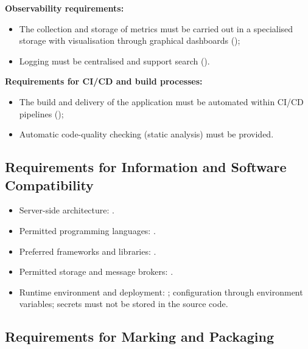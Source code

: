 \documentclass[12pt,a4paper]{extarticle}
\begin{document}
\textbf{Observability requirements:}

\begin{itemize}[leftmargin=1.25cm]
\item The collection and storage of metrics must be carried out in a specialised storage with visualisation through graphical dashboards ();
\item Logging must be centralised and support search ().
\end{itemize}

\textbf{Requirements for CI/CD and build processes:}

\begin{itemize}[leftmargin=1.25cm]
\item The build and delivery of the application must be automated within CI/CD pipelines ();
\item Automatic code-quality checking (static analysis) must be provided.
\end{itemize}

\subsection{Requirements for Information and Software Compatibility}

\begin{itemize}[leftmargin=1.25cm]
\item Server-side architecture: .
\item Permitted programming languages: .
\item Preferred frameworks and libraries: .
\item Permitted storage and message brokers: .
\item Runtime environment and deployment: ; configuration through environment variables; secrets must not be stored in the source code.
\end{itemize}

\subsection{Requirements for Marking and Packaging}
\end{document}
